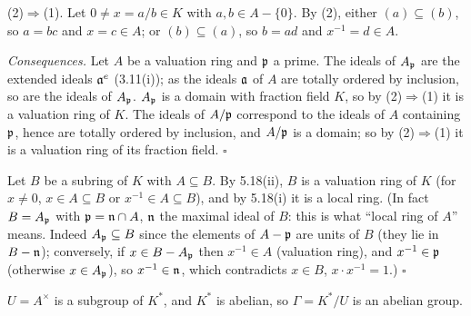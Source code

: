\documentclass[11pt]{article}
\begin{document}
(2)$\Rightarrow$(1). Let $0\ne x=a/b\in K$ with $a,b\in A-\{0\}$. By (2), either $(a)\subseteq(b)$, so $a=bc$ and $x=c\in A$; or $(b)\subseteq(a)$, so $b=ad$ and $x^{-1}=d\in A$.

\emph{Consequences.} Let $A$ be a valuation ring and $\mathfrak p$ a prime. The ideals of $A_\mathfrak p$ are the extended ideals $\mathfrak a^e$ (3.11(i)); as the ideals $\mathfrak a$ of $A$ are totally ordered by inclusion, so are the ideals of $A_\mathfrak p$. $A_\mathfrak p$ is a domain with fraction field $K$, so by (2)$\Rightarrow$(1) it is a valuation ring of $K$. The ideals of $A/\mathfrak p$ correspond to the ideals of $A$ containing $\mathfrak p$, hence are totally ordered by inclusion, and $A/\mathfrak p$ is a domain; so by (2)$\Rightarrow$(1) it is a valuation ring of its fraction field. \hfill$\square$

\pf
Let $B$ be a subring of $K$ with $A\subseteq B$. By 5.18(ii), $B$ is a valuation ring of $K$ (for $x\ne0$, $x\in A\subseteq B$ or $x^{-1}\in A\subseteq B$), and by 5.18(i) it is a local ring. (In fact $B=A_\mathfrak p$ with $\mathfrak p=\mathfrak n\cap A$, $\mathfrak n$ the maximal ideal of $B$: this is what ``local ring of $A$'' means. Indeed $A_\mathfrak p\subseteq B$ since the elements of $A-\mathfrak p$ are units of $B$ (they lie in $B-\mathfrak n$); conversely, if $x\in B-A_\mathfrak p$ then $x^{-1}\in A$ (valuation ring), and $x^{-1}\in\mathfrak p$ (otherwise $x\in A_\mathfrak p$), so $x^{-1}\in\mathfrak n$, which contradicts $x\in B$, $x\cdot x^{-1}=1$.) \hfill$\square$

\pf
$U=A^\times$ is a subgroup of $K^*$, and $K^*$ is abelian, so $\Gamma=K^*/U$ is an abelian group.
\end{document}
